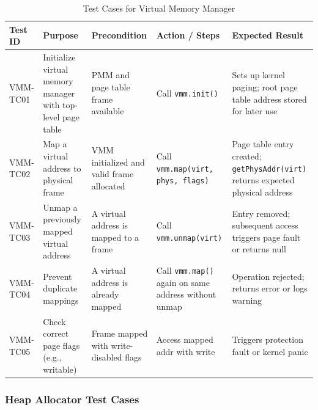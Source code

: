 \documentclass[12pt]{extarticle}
\begin{document}
\begin{table}[H]
\centering
\renewcommand{\arraystretch}{1.3}
\begin{tabular}{|p{1.4cm}|p{3.2cm}|p{3.0cm}|p{3.4cm}|p{3.4cm}|}
\hline
\textbf{Test ID} & \textbf{Purpose} & \textbf{Precondition} & \textbf{Action / Steps} & \textbf{Expected Result} \\
\hline

VMM-TC01 & Initialize virtual memory manager with top-level page table & PMM and page table frame available & Call \texttt{vmm.init()} & Sets up kernel paging; root page table address stored for later use \\
\hline

VMM-TC02 & Map a virtual address to physical frame & VMM initialized and valid frame allocated & Call \texttt{vmm.map(virt, phys, flags)} & Page table entry created; \texttt{getPhysAddr(virt)} returns expected physical address \\
\hline

VMM-TC03 & Unmap a previously mapped virtual address & A virtual address is mapped to a frame & Call \texttt{vmm.unmap(virt)} & Entry removed; subsequent access triggers page fault or returns null \\
\hline

VMM-TC04 & Prevent duplicate mappings & A virtual address is already mapped & Call \texttt{vmm.map()} again on same address without unmap & Operation rejected; returns error or logs warning \\
\hline

VMM-TC05 & Check correct page flags (e.g., writable) & Frame mapped with write-disabled flags & Access mapped addr with write & Triggers protection fault or kernel panic \\
\hline

\end{tabular}
\caption{Test Cases for Virtual Memory Manager}
\label{table:vmm-main-tests}
\end{table}

\subsubsection{Heap Allocator Test Cases}
\end{document}
